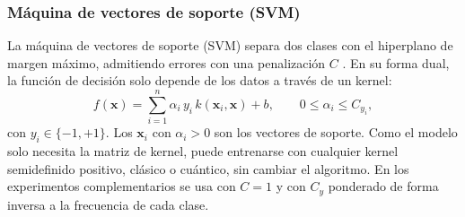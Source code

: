 
\subsubsection{Máquina de vectores de soporte (SVM)}
\label{sec:svm}

La máquina de vectores de soporte (SVM) separa dos clases con el hiperplano de margen máximo, admitiendo errores con una penalización $C$ \cite{CortesVapnik1995}. En su forma dual, la función de decisión solo depende de los datos a través de un kernel:
\begin{equation}
  f(\mathbf{x}) = \sum_{i=1}^{n} \alpha_i\, y_i\, k(\mathbf{x}_i, \mathbf{x}) + b,
  \qquad 0 \le \alpha_i \le C_{y_i},
  \label{eq:svm_dual}
\end{equation}
con $y_i \in \{-1, +1\}$. Los $\mathbf{x}_i$ con $\alpha_i > 0$ son los vectores de soporte. Como el modelo solo necesita la matriz de kernel, puede entrenarse con cualquier kernel semidefinido positivo, clásico o cuántico, sin cambiar el algoritmo. En los experimentos complementarios se usa con $C = 1$ y con $C_{y}$ ponderado de forma inversa a la frecuencia de cada clase.
